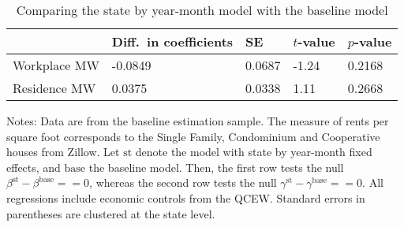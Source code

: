 \begin{table}[hbt!]
    \centering
    \caption{Comparing the state by year-month model with the baseline model}
    \label{tab:test_stateFE}

    \begin{tabular}{@{}lllll@{}}
        \toprule
                     & Diff.\ in coefficients & SE & $t$-value & $p$-value \\ \midrule
        Workplace MW &  -0.0849 & 0.0687 & -1.24 & 0.2168 \\
        Residence MW &  0.0375 & 0.0338 & 1.11 & 0.2668 \\ \bottomrule
    \end{tabular}

    \begin{minipage}{.95\textwidth} \footnotesize
        \vspace{2mm}
        Notes: 
        Data are from the baseline estimation sample.
        The measure of rents per square foot corresponds to the Single Family, 
        Condominium and Cooperative houses from Zillow.
        Let $\text{st}$ denote the model with state by year-month fixed effects,
        and $\text{base}$ the baseline model.
        Then, the first row tests the null $\beta^{\text{st}} - \beta^{\text{base}} == 0$,
        whereas the second row tests the null $\gamma^{\text{st}} - \gamma^{\text{base}} == 0$.
        All regressions include economic controls from the QCEW.
        Standard errors in parentheses are clustered at the state level.
    \end{minipage}
\end{table}
